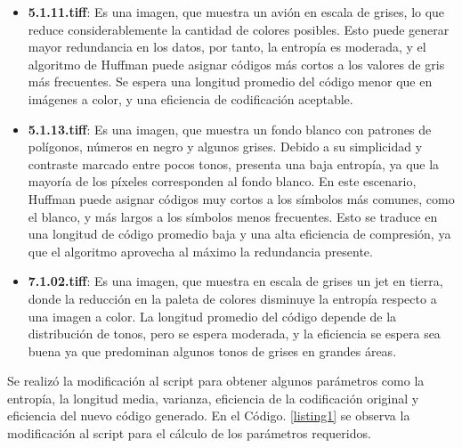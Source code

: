 \documentclass[conference,onecolumn,12pt]{IEEEtran}
\numberwithin{equation}{subsection}
\begin{document}
\begin{itemize}
    \item \textbf{5.1.11.tiff}: Es una imagen, que muestra un avión en escala de grises, lo que reduce considerablemente la cantidad de colores posibles. Esto puede generar mayor redundancia en los datos, por tanto, la entropía es moderada, y el algoritmo de Huffman puede asignar códigos más cortos a los valores de gris más frecuentes. Se espera una longitud promedio del código menor que en imágenes a color, y una eficiencia de codificación aceptable.
    \item \textbf{5.1.13.tiff}: Es una imagen, que muestra un fondo blanco con patrones de polígonos, números en negro y algunos grises. Debido a su simplicidad y contraste marcado entre pocos tonos, presenta una baja entropía, ya que la mayoría de los píxeles corresponden al fondo blanco. En este escenario, Huffman puede asignar códigos muy cortos a los símbolos más comunes, como el blanco, y más largos a los símbolos menos frecuentes. Esto se traduce en una longitud de código promedio baja y una alta eficiencia de compresión, ya que el algoritmo aprovecha al máximo la redundancia presente.
    \item \textbf{7.1.02.tiff}: Es una imagen, que muestra en escala de grises un jet en tierra, donde la reducción en la paleta de colores disminuye la entropía respecto a una imagen a color. La longitud promedio del código depende de la distribución de tonos, pero se espera moderada, y la eficiencia se espera sea buena ya que predominan algunos tonos de grises en grandes áreas.
\end{itemize}

\newpage

Se realizó la modificación al script para obtener algunos parámetros como la entropía, la longitud media, varianza, eficiencia de la codificación original y eficiencia del nuevo código generado. En el Código. \ref{listing1} se observa la modificación al script para el cálculo de los parámetros requeridos.
\end{document}
